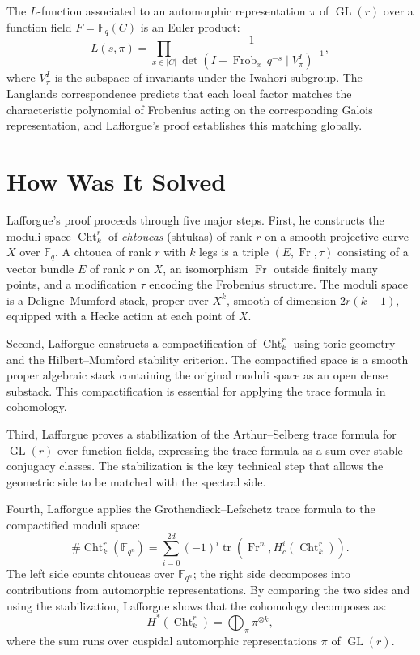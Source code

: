 The $L$-function associated to an automorphic representation $\pi$ of $\operatorname{GL}(r)$ over a function field $F = \mathbb{F}_q(C)$ is an Euler product:
\[
L(s, \pi) = \prod_{x \in |C|} \frac{1}{\det(I - \operatorname{Frob}_x \, q^{-s} \mid V_\pi^I)^{-1}},
\]
where $V_\pi^I$ is the subspace of invariants under the Iwahori subgroup. The Langlands correspondence predicts that each local factor matches the characteristic polynomial of Frobenius acting on the corresponding Galois representation, and Lafforgue's proof establishes this matching globally.

\section{How Was It Solved}

Lafforgue's proof proceeds through five major steps. First, he constructs the moduli space $\operatorname{Cht}^r_{k}$ of \emph{chtoucas} (shtukas) of rank $r$ on a smooth projective curve $X$ over $\mathbb{F}_q$. A chtouca of rank $r$ with $k$ legs is a triple $(E, \operatorname{Fr}, \tau)$ consisting of a vector bundle $E$ of rank $r$ on $X$, an isomorphism $\operatorname{Fr}$ outside finitely many points, and a modification $\tau$ encoding the Frobenius structure. The moduli space is a Deligne--Mumford stack, proper over $X^k$, smooth of dimension $2r(k-1)$, equipped with a Hecke action at each point of $X$.

Second, Lafforgue constructs a compactification of $\operatorname{Cht}^r_k$ using toric geometry and the Hilbert--Mumford stability criterion. The compactified space is a smooth proper algebraic stack containing the original moduli space as an open dense substack. This compactification is essential for applying the trace formula in cohomology.

Third, Lafforgue proves a stabilization of the Arthur--Selberg trace formula for $\operatorname{GL}(r)$ over function fields, expressing the trace formula as a sum over stable conjugacy classes. The stabilization is the key technical step that allows the geometric side to be matched with the spectral side.

Fourth, Lafforgue applies the Grothendieck--Lefschetz trace formula to the compactified moduli space:
\[
\#\operatorname{Cht}^r_k(\mathbb{F}_{q^n}) = \sum_{i=0}^{2d} (-1)^i \operatorname{tr}(\operatorname{Fr}^n, H^i_c(\operatorname{Cht}^r_k)).
\]
The left side counts chtoucas over $\mathbb{F}_{q^n}$; the right side decomposes into contributions from automorphic representations. By comparing the two sides and using the stabilization, Lafforgue shows that the cohomology decomposes as:
\[
H^*(\operatorname{Cht}^r_k) = \bigoplus_{\pi} \pi^{\otimes k},
\]
where the sum runs over cuspidal automorphic representations $\pi$ of $\operatorname{GL}(r)$.

